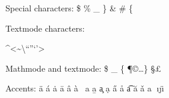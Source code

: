 \documentclass[12pt,a4paper,onecolumn]{article}
\begin{document}
\noindent
Special characters: \$  \%  \_  \}  \&  \#  \{

\noindent
Textmode characters: 
\par\noindent
\textasciicircum  \textless  \textasciitilde  \textordfeminine    \textasteriskcentered  \textordmasculine  \textbackslash  \textparagraph  \textbar  \textperiodcentered  \textbraceleft  \textquestiondown  \textbraceright  \textquotedblleft  \textbullet  \textquotedblright  \textcopyright  \textquoteleft  \textdagger  \textquoteright  \textdaggerdbl  \textregistered  \textdollar  \textsection  \textellipsis  \textsterling  \textemdash  \texttrademark  \textendash  \textunderscore  \textexclamdown  \textvisiblespace  \textgreater                                                      

\noindent
Mathmode and textmode: \$  \_  \ddag  \{  \P  \copyright  \dots  \}  \S  \dag  \pounds

\noindent
Accents: \"{a}  \'{a}  \.{a}  \={a}  \^{a}  \`{a}  \  {a}  \b{a}  \c{a}  \d{a}  \H{a}  \r{a}  \t{a}  \u{a}  \v{a}  \textcircled{a}  \i  \j  \"{\i}
\end{document}
